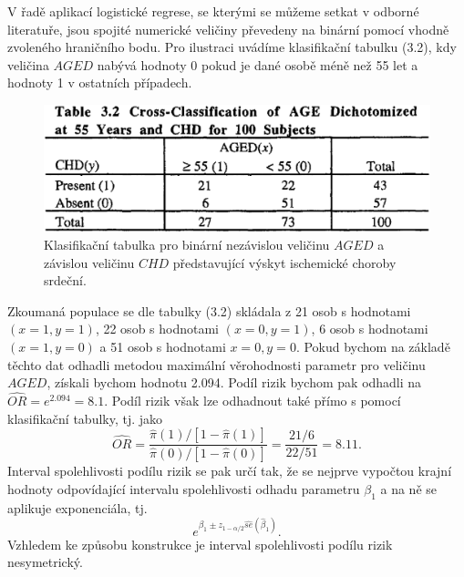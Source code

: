V řadě aplikací logistické regrese, se kterými se můžeme setkat v odborné literatuře, jsou spojité numerické veličiny převedeny na binární pomocí vhodně zvoleného hraničního bodu. Pro ilustraci uvádíme klasifikační tabulku (3.2), kdy veličina $AGED$ nabývá hodnoty 0 pokud je dané osobě méně než 55 let a hodnoty 1 v ostatních případech.
\begin{figure}[htp]
\centering
\includegraphics[scale = 0.35]{pictures/tbl_3_2.eps}
\caption{Klasifikační tabulka pro binární nezávislou veličinu $AGED$ a závislou veličinu $CHD$ představující výskyt ischemické choroby srdeční.}
\label{tbl_3_2}
\end{figure}
Zkoumaná populace se dle tabulky (3.2) skládala z 21 osob s hodnotami $(x = 1, y = 1)$, 22 osob s hodnotami $(x = 0, y = 1)$, 6 osob s hodnotami $(x = 1, y = 0)$ a 51 osob s hodnotami $x = 0, y = 0$. Pokud bychom na základě těchto dat odhadli metodou maximální věrohodnosti parametr pro veličinu $AGED$, získali bychom hodnotu 2.094. Podíl rizik bychom pak odhadli na $\widehat{OR} = e^{2.094} = 8.1$. Podíl rizik však lze odhadnout také přímo s pomocí klasifikační tabulky, tj. jako
\begin{equation}
\widehat{OR} = \frac{\hat{\pi}(1) / [1 - \hat{\pi}(1)]}{\hat{\pi}(0) / [1 - \hat{\pi}(0)]} = \frac{21/6}{22/51} = 8.11.
\end{equation}
Interval spolehlivosti podílu rizik se pak určí tak, že se nejprve vypočtou krajní hodnoty odpovídající intervalu spolehlivosti odhadu parametru $\beta_1$ a na ně se aplikuje exponenciála, tj.
\begin{equation}
e^{\beta_1 \pm z_{1 - \alpha / 2} \widehat{se}(\hat{\beta}_1)}.
\end{equation}
Vzhledem ke způsobu konstrukce je interval spolehlivosti podílu rizik nesymetrický.

